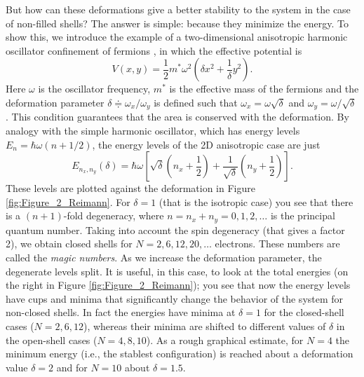 \documentclass[a4paper,twoside,11pt]{book}
\begin{document}
But how can these deformations give a better stability to the system in the case of non-filled shells? The answer is simple: because they minimize the energy. To show this, we introduce the example of a two-dimensional anisotropic harmonic oscillator confinement of fermions \citep[as in][]{Reimann2002}, in which the effective potential is 
\begin{equation}
	V(x,y) = \frac{1}{2}m^*\omega^2\left(\delta x^2 + \frac{1}{\delta}y^2\right).
\end{equation}
Here $\omega$ is the oscillator frequency, $m^*$ is the effective mass of the fermions and the deformation parameter $\delta \doteqdot \omega_x/\omega_y$ is defined such that $\omega_x=\omega\sqrt{\delta}$ and $\omega_y=\omega/\sqrt{\delta}$. This condition guarantees that the area is conserved with the deformation. By analogy with the simple harmonic oscillator, which has energy levels $E_n = \hbar\omega(n+1/2)$, the energy levels of the 2D anisotropic case are just
\begin{equation}
	E_{n_x,n_y}(\delta) = \hbar\omega\left[\sqrt{\delta}\left(n_x+\frac{1}{2}\right) + \frac{1}{\sqrt{\delta}}\left(n_y+\frac{1}{2}\right)\right].
\end{equation}
These levels are plotted against the deformation in Figure \ref{fig:Figure_2_Reimann}. For $\delta=1$ (that is the isotropic case) you see that there is a $(n+1)$-fold degeneracy, where $n=n_x+n_y=0,1,2,\ldots$ is the principal quantum number. Taking into account the spin degeneracy (that gives a factor 2), we obtain closed shells for $N=2,6,12,20,\ldots$ electrons. These numbers are called the \emph{magic numbers}. As we increase the deformation parameter, the degenerate levels split. It is useful, in this case, to look at the total energies (on the right in Figure \ref{fig:Figure_2_Reimann}); you see that now the energy levels have cups and minima that significantly change the behavior of the system for non-closed shells. In fact the energies have minima at $\delta=1$ for the closed-shell cases ($N=2,6,12$), whereas their minima are shifted to different values of $\delta$ in the open-shell cases ($N=4,8,10$). As a rough graphical estimate, for $N=4$ the minimum energy (i.e., the stablest configuration) is reached about a deformation value $\delta=2$ and for $N=10$ about $\delta=1.5$.
\end{document}
